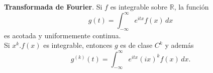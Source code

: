 \documentclass{book}
\newcommand{\rr}{\mathbb{R}}
\begin{document}
\begin{ejer}{}
  {\bf{Transformada de Fourier}}. Si $f$ es integrable sobre $\rr$, la función 
   $$g(t)=\int_{-\infty}^{\infty} e^{i t x} f(x)\,dx $$
   es acotada y uniformemente continua.
   \\
   Si $x^k.f(x)$ es integrable, entonces $g$ es de clase $C^k$ y además 
   $$g^{(k)}(t)=\int_{-\infty}^{\infty} e^{i t x} (i x)^k  f(x)\,dx.$$
 \end{ejer}
   
  




	
	
	
	


\end{document}
